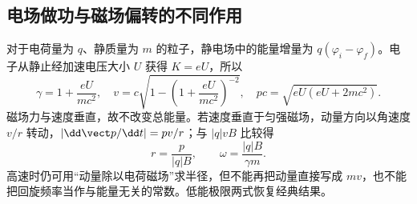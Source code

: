 \subsection{电场做功与磁场偏转的不同作用}
对于电荷量为 $q$、静质量为 $m$ 的粒子，静电场中的能量增量为 $q(\varphi_i-\varphi_f)$。电子从静止经加速电压大小 $U$ 获得 $K=eU$，所以
\[
 \gamma=1+\frac{eU}{mc^2},\quad
 v=c\sqrt{1-\left(1+\frac{eU}{mc^2}\right)^{-2}},\quad
 pc=\sqrt{eU(eU+2mc^2)}.
\]
磁场力与速度垂直，故不改变总能量。若速度垂直于匀强磁场，动量方向以角速度 $v/r$ 转动，$|\dd\vect p/\dd t|=pv/r$；与 $|q|vB$ 比较得
\[
 r=\frac p{|q|B},\qquad \omega=\frac{|q|B}{\gamma m}.
\]
高速时仍可用“动量除以电荷磁场”求半径，但不能再把动量直接写成 $mv$，也不能把回旋频率当作与能量无关的常数。低能极限两式恢复经典结果。

